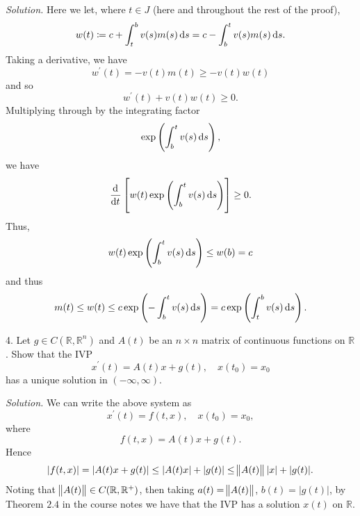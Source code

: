 \documentclass{article}
\newcommand{\R}{\mathbb{R}}
\begin{document}
\textit{Solution.}
%
Here we let, where $t \in J$ (here and throughout the rest of the proof),
%
\begin{equation*}
    w(t) \coloneqq c + \int_t^b v(s) m(s) \dif s
         = c - \int_b^t v(s) m(s) \dif s
    .
\end{equation*}
%
Taking a derivative, we have
%
\begin{equation*}
    w^\prime(t) = - v(t) m(t) \geq - v(t) w(t)
\end{equation*}
%
and so
%
\begin{equation*}
    w^\prime(t) + v(t) w(t) \geq 0
    .
\end{equation*}
%
Multiplying through by the integrating factor
%
\begin{equation*}
    \exp\del{\int_b^t v(s) \dif s},
\end{equation*}
%
we have
%
\begin{equation*}
    \dod{}{t} \sbr{
        w(t)
        \exp\del{\int_b^t v(s) \dif s}
    }
    \geq 0
    .
\end{equation*}
%
Thus,
%
\begin{equation*}
    w(t) \exp\del{\int_b^t v(s) \dif s} \leq w(b) = c
\end{equation*}
%
and thus
%
\begin{equation*}
    m(t)
    \leq w(t)
    \leq c \exp\del{- \int_b^t v(s) \dif s}
    = c \exp\del{\int_t^b v(s) \dif s}
    .
\end{equation*}

\newpage

4. Let $g \in C(\R, \R^n)$ and $A(t)$ be an $n \times n$ matrix of continuous functions on $\R$.
Show that the IVP
%
\begin{equation*}
    x^\prime(t) = A(t) x + g(t), \quad x(t_0) = x_0
\end{equation*}
%
has a unique solution in $(-\infty, \infty)$.

\textit{Solution.}
We can write the above system as
%
\begin{equation*}
    x^\prime(t) = f(t, x), \quad x(t_0) = x_0
    ,
\end{equation*}
%
where
%
\begin{equation*}
    f(t, x) = A(t) x + g(t)
    .
\end{equation*}
%
Hence
%
\begin{equation*}
    |f(t, x)|
    = |A(t) x + g(t)|
    \leq |A(t) x| + |g(t)|
    \leq \enVert{A(t)} |x| + |g(t)|
    .
\end{equation*}
%
Noting that $\enVert{A(t)} \in C(\R, \R^+)$, then taking
$a(t) = \enVert{A(t)}$, $b(t) = |g(t)|$, by Theorem $2.4$ in the course
notes we have that the IVP has a solution $x(t)$ on $\R$.
\end{document}
